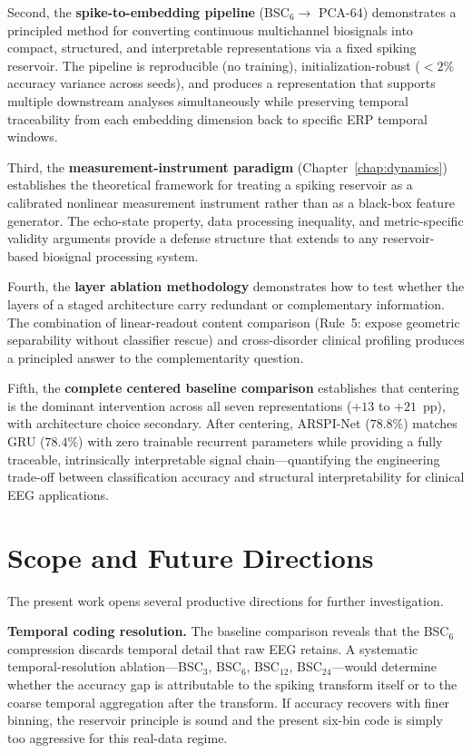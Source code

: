 Second, the \textbf{spike-to-embedding pipeline} (BSC$_6 \to$ PCA-64) demonstrates a principled method for converting continuous multichannel biosignals into compact, structured, and interpretable representations via a fixed spiking reservoir. The pipeline is reproducible (no training), initialization-robust ($< 2\%$ accuracy variance across seeds), and produces a representation that supports multiple downstream analyses simultaneously while preserving temporal traceability from each embedding dimension back to specific ERP temporal windows.

Third, the \textbf{measurement-instrument paradigm} (Chapter~\ref{chap:dynamics}) establishes the theoretical framework for treating a spiking reservoir as a calibrated nonlinear measurement instrument rather than as a black-box feature generator. The echo-state property, data processing inequality, and metric-specific validity arguments provide a defense structure that extends to any reservoir-based biosignal processing system.

Fourth, the \textbf{layer ablation methodology} demonstrates how to test whether the layers of a staged architecture carry redundant or complementary information. The combination of linear-readout content comparison (Rule~5: expose geometric separability without classifier rescue) and cross-disorder clinical profiling produces a principled answer to the complementarity question.

Fifth, the \textbf{complete centered baseline comparison} establishes that centering is the dominant intervention across all seven representations ($+13$ to $+21$~pp), with architecture choice secondary. After centering, ARSPI-Net ($78.8\%$) matches GRU ($78.4\%$) with zero trainable recurrent parameters while providing a fully traceable, intrinsically interpretable signal chain---quantifying the engineering trade-off between classification accuracy and structural interpretability for clinical EEG applications.


\section{Scope and Future Directions}

The present work opens several productive directions for further investigation.

\textbf{Temporal coding resolution.} The baseline comparison reveals that the BSC$_6$ compression discards temporal detail that raw EEG retains. A systematic temporal-resolution ablation---BSC$_3$, BSC$_6$, BSC$_{12}$, BSC$_{24}$---would determine whether the accuracy gap is attributable to the spiking transform itself or to the coarse temporal aggregation after the transform. If accuracy recovers with finer binning, the reservoir principle is sound and the present six-bin code is simply too aggressive for this real-data regime.

